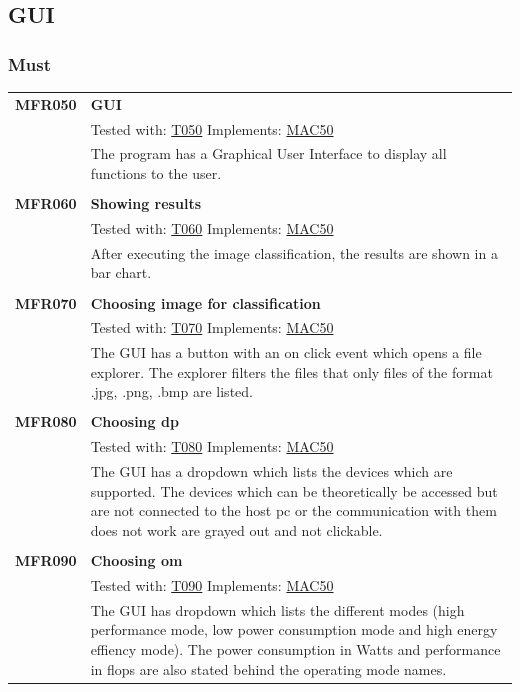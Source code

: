\documentclass[parskip=full]{scrartcl}
\begin{document}
\subsection{GUI}
\subsubsection{Must}
\begin{tabular}{p{2cm}p{11.4cm}}
\textbf {MFR050} \hypertarget{MFR050}& \textbf{GUI} \\
& Tested with: \hyperlink{T050}{T050} Implements: \hyperlink{MAC50}{MAC50} \\
& The program has a Graphical User Interface to display all functions to the user. \\
& \\
\textbf {MFR060}\hypertarget{MFR060}  & \textbf{Showing results} \\
& Tested with: \hyperlink{T060}{T060} Implements: \hyperlink{MAC50}{MAC50} \\
& After executing the \gls{image classification}, the results are shown in a bar chart. \\
& \\
\textbf{MFR070} \hypertarget{MFR070}& \textbf{Choosing image for classification}\\
& Tested with: \hyperlink{T070}{T070} Implements: \hyperlink{MAC50}{MAC50} \\
& The GUI has a button with an on click event which opens a file explorer. The explorer filters the files that only files of the format .jpg, .png, .bmp are listed.\\
& \\
\textbf{MFR080} \hypertarget{MFR080}& \textbf{Choosing \gls{dp}}\\
& Tested with: \hyperlink{T080}{T080} Implements: \hyperlink{MAC50}{MAC50} \\
& The GUI has a dropdown which lists the devices which are supported. The devices which can be theoretically be accessed but are not connected to the \gls{host pc} or the communication with them does not work are grayed out and not clickable. \\
& \\
\textbf{MFR090}\hypertarget{MFR090} & \textbf{Choosing \gls{om}}\\
& Tested with: \hyperlink{T090}{T090} Implements: \hyperlink{MAC50}{MAC50}  \\
& The GUI has dropdown which lists the different modes (high \gls{performance} mode, low \gls{power consumption} mode and high energy effiency mode). The \gls{power consumption} in Watts and \gls{performance} in \gls{flops} are also stated behind the operating mode names.
\end{tabular}
\end{document}
